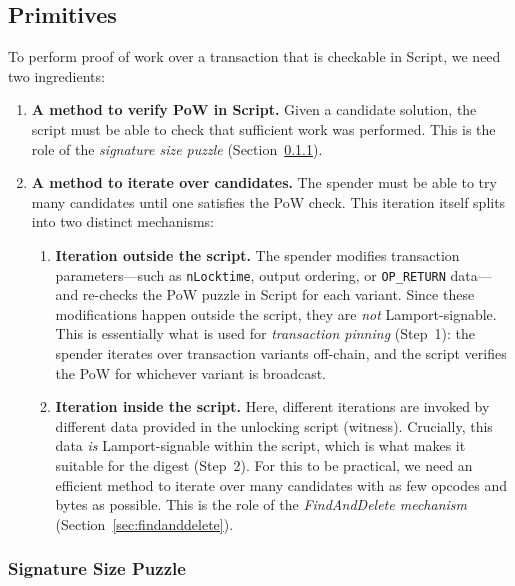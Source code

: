 \documentclass[11pt, a4paper]{article}
\begin{document}
\subsection{Primitives}
\label{sec:primitives}

To perform proof of work over a transaction that is checkable in Script, we need two ingredients:

\begin{enumerate}
    \item \textbf{A method to verify PoW in Script.} Given a candidate solution, the script must be able to check that sufficient work was performed. This is the role of the \emph{signature size puzzle} (Section~\ref{sec:sig-size-puzzle}).

    \item \textbf{A method to iterate over candidates.} The spender must be able to try many candidates until one satisfies the PoW check. This iteration itself splits into two distinct mechanisms:

    \begin{enumerate}
        \item \textbf{Iteration outside the script.} The spender modifies transaction parameters---such as \texttt{nLocktime}, output ordering, or \texttt{OP\_RETURN} data---and re-checks the PoW puzzle in Script for each variant. Since these modifications happen outside the script, they are \emph{not} Lamport-signable. This is essentially what is used for \emph{transaction pinning} (Step~1): the spender iterates over transaction variants off-chain, and the script verifies the PoW for whichever variant is broadcast.

        \item \textbf{Iteration inside the script.} Here, different iterations are invoked by different data provided in the unlocking script (witness). Crucially, this data \emph{is} Lamport-signable within the script, which is what makes it suitable for the digest (Step~2). For this to be practical, we need an efficient method to iterate over many candidates with as few opcodes and bytes as possible. This is the role of the \emph{FindAndDelete mechanism} (Section~\ref{sec:findanddelete}).
    \end{enumerate}
\end{enumerate}

\subsubsection{Signature Size Puzzle}
\label{sec:sig-size-puzzle}
\end{document}

